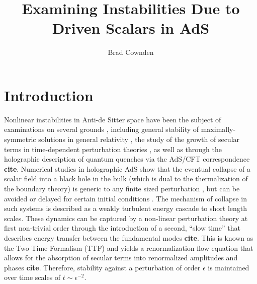 \documentclass[letterpaper,11pt]{article}
\title{Examining Instabilities Due to Driven Scalars in AdS}
\author{Brad Cownden}
\affiliation{Department of Physics \& Astronomy\\ University of Manitoba,
Winnipeg, Manitoba R3T 2N2, Canada}
\begin{document}
\maketitle
\flushbottom
\newpage


\section{Introduction}

Nonlinear instabilities in Anti-de Sitter space have been the subject of examinations on several grounds \cite{ 1708.05600, 1501.00007}, including general stability of maximally-symmetric solutions in general relativity \cite{1104.3702, 1208.5772}, the study of the growth of secular terms in time-dependent perturbation theories \cite{hep-th/9506161}, as well as through the holographic description of quantum quenches via the AdS/CFT correspondence {\bf cite}. Numerical studies in holographic AdS show that the eventual collapse of a scalar field into a black hole in the bulk (which is dual to the thermalization of the boundary theory) is generic to any finite sized perturbation \cite{1104.3702, 1106.2339, 1108.4539}, but can be avoided or delayed for certain initial conditions \cite{1803.02830, 1711.00454}. The mechanism of collapse in such systems is described as a weakly turbulent energy cascade to short length scales. These dynamics can be captured by a non-linear perturbation theory at first non-trivial order through the introduction of a second, ``slow time'' that describes energy transfer between the fundamental modes {\bf cite}. This is known as the Two-Time Formalism (TTF) \cite{1403.6471} and yields a renormalization flow equation that allows for the absorption of secular terms into renormalized amplitudes and phases {\bf cite}. Therefore, stability against a perturbation of order $\epsilon$ is maintained over time scales of $t \sim \epsilon^{-2}$.
\end{document}
